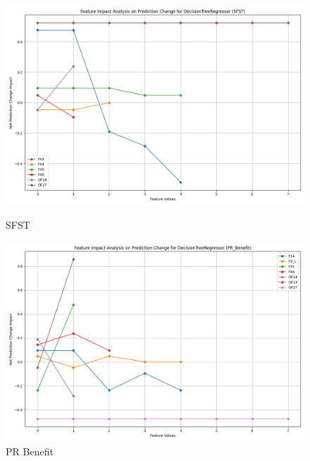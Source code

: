 \begin{figure}[H]
    \centering
    \begin{minipage}{0.495\textwidth}
        \centering
        \includegraphics[width=\linewidth]{analysis/images_reg/feature_impact_prediction_change_SFST_DecisionTreeRegressor.png}
        \caption{SFST}
        \label{fig:sfst_class_analysis_reg}
    \end{minipage}\hfill
    \begin{minipage}{0.495\textwidth}
        \centering
        \includegraphics[width=\linewidth]{analysis/images_reg/feature_impact_prediction_change_PR_Benefit_DecisionTreeRegressor.png}
        \caption{PR Benefit}
        \label{fig:pr_ben_class_analysis_reg}
    \end{minipage}
\end{figure}

